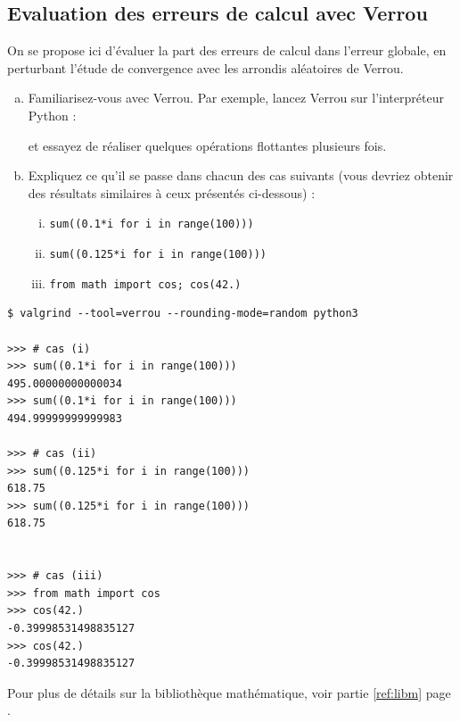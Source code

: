 \documentclass[a4paper]{article}
\newenvironment{commandline}{
  \begin{mdframed}[style=commandline]
}{
  \end{mdframed}
}
\newcounter{Question}
\newenvironment{question}[1][\unskip]{
  \bigskip
  \stepcounter{Question}
  \def\questionTitle{ #1}
  \begin{mdframed}[style=question]
  }{
  \end{mdframed}
}
\begin{document}
\subsection{Evaluation des erreurs de calcul avec Verrou}

On se propose ici d'évaluer la part des erreurs de calcul dans l'erreur globale,
en perturbant l'étude de convergence avec les arrondis aléatoires de Verrou.

\begin{question}
  \begin{enumerate}[(a)]
  \item Familiarisez-vous avec Verrou. Par exemple, lancez Verrou sur
    l'interpréteur Python :

  
    et essayez de réaliser quelques opérations flottantes plusieurs fois.

  \item Expliquez ce qu'il se passe dans chacun des cas suivants (vous devriez
    obtenir des résultats similaires à ceux présentés ci-dessous) :
    \begin{enumerate}[(i)]
    \item {\tt sum((0.1*i for i in range(100)))}
    \item {\tt sum((0.125*i for i in range(100)))}
    \item {\tt from math import cos; cos(42.)}
    \end{enumerate}
  \end{enumerate}
\end{question}
\begin{commandline}
\begin{verbatim}
$ valgrind --tool=verrou --rounding-mode=random python3

>>> # cas (i)
>>> sum((0.1*i for i in range(100)))
495.00000000000034
>>> sum((0.1*i for i in range(100)))
494.99999999999983

>>> # cas (ii)
>>> sum((0.125*i for i in range(100)))
618.75
>>> sum((0.125*i for i in range(100)))
618.75


>>> # cas (iii)
>>> from math import cos
>>> cos(42.)
-0.39998531498835127
>>> cos(42.)
-0.39998531498835127
\end{verbatim}
\end{commandline}
Pour plus de détails sur la bibliothèque mathématique, voir partie \ref{ref:libm} page \pageref{ref:libm}.

\bigskip
\end{document}
